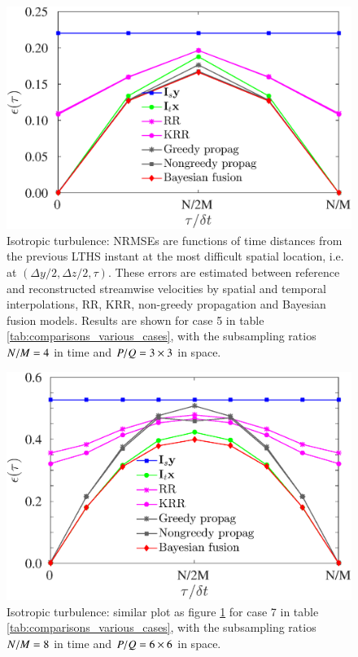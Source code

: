 \begin{figure}
\begin{center}
\includegraphics[width = 0.7\columnwidth]{./images/comparisons/isotropic/compare_NRMSE_time_middlepoints_sspacing3_tspacing4.eps}
\caption{\label{fig:final_isotropic_error_time_case5} Isotropic turbulence: NRMSEs are functions of time distances from the previous LTHS instant at the most difficult spatial location, i.e. at $ (\Delta y/2,\Delta z/2,\tau) $. These errors are estimated between reference and reconstructed streamwise velocities by spatial and temporal interpolations, RR, KRR, non-greedy propagation and Bayesian fusion models. Results are shown for case 5 in table \ref{tab:comparisons_various_cases}, with the subsampling ratios $ N/M = 4 $ in time and $ P/Q = 3 \times 3 $ in space.}
\end{center}
\end{figure}

\begin{figure}
\begin{center}
\includegraphics[width = 0.7\columnwidth]{./images/comparisons/isotropic/compare_NRMSE_time_middlepoints_sspacing6_tspacing8.eps}
\caption{\label{fig:final_isotropic_error_time_case7} Isotropic turbulence: similar plot as figure \ref{fig:final_isotropic_error_time_case5} for case 7 in table \ref{tab:comparisons_various_cases}, with the subsampling ratios $ N/M = 8 $ in time and $ P/Q = 6 \times 6 $ in space.}
\end{center}
\end{figure}

